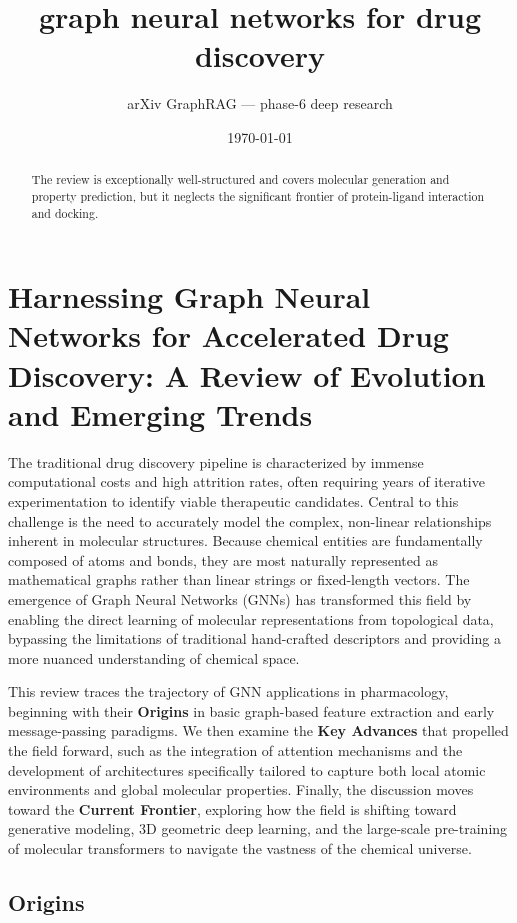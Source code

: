 \documentclass[11pt]{article}
\title{graph neural networks for drug discovery}
\author{arXiv GraphRAG --- phase-6 deep research}
\date{\today}
\begin{document}
\maketitle

\begin{abstract}
The review is exceptionally well-structured and covers molecular generation and property prediction, but it neglects the significant frontier of protein-ligand interaction and docking.
\end{abstract}

\section{Harnessing Graph Neural Networks for Accelerated Drug Discovery: A Review of Evolution and Emerging Trends}

The traditional drug discovery pipeline is characterized by immense computational costs and high attrition rates, often requiring years of iterative experimentation to identify viable therapeutic candidates. Central to this challenge is the need to accurately model the complex, non-linear relationships inherent in molecular structures. Because chemical entities are fundamentally composed of atoms and bonds, they are most naturally represented as mathematical graphs rather than linear strings or fixed-length vectors. The emergence of Graph Neural Networks (GNNs) has transformed this field by enabling the direct learning of molecular representations from topological data, bypassing the limitations of traditional hand-crafted descriptors and providing a more nuanced understanding of chemical space.

This review traces the trajectory of GNN applications in pharmacology, beginning with their \textbf{Origins} in basic graph-based feature extraction and early message-passing paradigms. We then examine the \textbf{Key Advances} that propelled the field forward, such as the integration of attention mechanisms and the development of architectures specifically tailored to capture both local atomic environments and global molecular properties. Finally, the discussion moves toward the \textbf{Current Frontier}, exploring how the field is shifting toward generative modeling, 3D geometric deep learning, and the large-scale pre-training of molecular transformers to navigate the vastness of the chemical universe.

\subsection{Origins}
\end{document}
